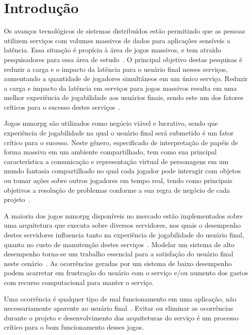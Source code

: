 \chapter{Introdução}
\label{introducao}



Os avanços tecnológicos de sistemas distribuídos estão permitindo que as pessoas utilizem serviços com volumes massivos de dados para aplicações sensíveis a latência.
%
Essa situação é propícia à área de jogos massivos, e tem atraído pesquisadores para essa área de estudo~\cite{mmo_analytic,1417630,6267019,6063041}.
%
O principal objetivo destas pesquisas é reduzir a carga e o impacto da latência para o usuário final nesses serviços, aumentando a quantidade de jogadores simultâneos em um único serviço.
%
Reduzir a carga e impacto da latência em serviços para jogos massivos resulta em uma melhor experiência de jogabilidade aos usuários finais, sendo este um dos fatores críticos para o sucesso destes serviços~\cite{1417630}.



Jogos \ac{mmorpg} são utilizados como negócio viável e lucrativo, sendo que experiência de jogabilidade na qual o usuário final será submetido é um fator crítico para o sucesso.
%
Neste gênero, especificado de interpretação de papéis de forma massiva em um ambiente compartilhado, tem como sua principal característica a comunicação e representação virtual de personagens em um mundo fantasia compartilhado no qual cada jogador pode interagir com objetos ou tomar ações sobre outros jogadores em tempo real, tendo como principais objetivos a resolução de problemas conforme a sua regra de negócio de cada projeto~\cite{video_game_technologies}.



A maioria dos jogos \ac{mmorpg} disponíveis no mercado estão implementados sobre uma arquitetura que executa sobre diversos servidores\cite{stephenclarkewillson2017}, nos quais o desempenho destes servidores influencia tanto na experiência de jogabilidade do usuário final, quanto no custo de manutenção destes serviços~\cite{1417630}.
%
Modelar um sistema de alto desempenho torna-se um trabalho essencial para a satisfação do usuário final neste cenário~\cite{1417630}.
%
As ocorrências geradas por um sistema de baixo desempenho podem acarretar em frustração do usuário com o serviço e/ou aumento dos gastos com recurso computacional para manter o serviço.



Uma ocorrência é qualquer tipo de mal funcionamento em uma aplicação, não necessariamente aparente ao usuário final~\cite{1417630}.
%
Evitar ou eliminar as ocorrências durante o projeto e desenvolvimento das arquiteturas do serviço é um processo crítico para o bom funcionamento desses jogos.



